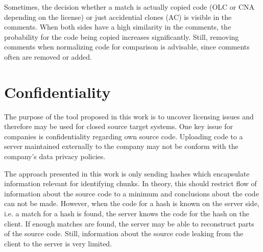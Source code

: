 Sometimes, the decision whether a match is actually copied code (OLC or CNA depending on the license) or just accidential clones (AC) is visible in the comments.
When both sides have a high similarity in the comments, the probability for the code being copied increases significantly.
Still, removing comments when normalizing code for comparison is advisable, since comments often are removed or added.

\section{Confidentiality}
The purpose of the tool proposed in this work is to uncover licensing issues and therefore may be used for closed source target systems.
One key issue for companies is confidentiality regarding own source code.
Uploading code to a server maintained externally to the company may not be conform with the company's data privacy policies.

The approach presented in this work is only sending hashes which encapsulate information relevant for identifying chunks.
In theory, this should restrict flow of information about the source code to a minimum and conclusions about the code can not be made.
However, when the code for a hash is known on the server side, i.e. a match for a hash is found, the server knows the code for the hash on the client.
If enough matches are found, the server may be able to reconstruct parts of the source code.
Still, information about the source code leaking from the client to the server is very limited.